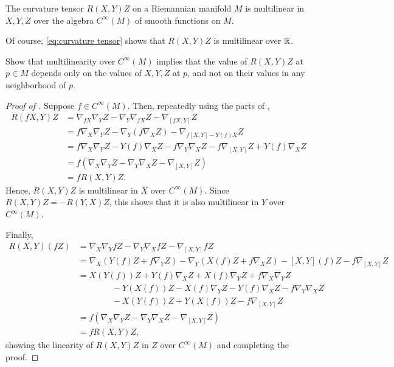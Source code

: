 \begin{proposition}\label{prop:multilinearity of R}
	The curvature tensor $R(X,Y)Z$ on a Riemannian manifold $M$ is multilinear in $X,Y,Z$ over the algebra $C^\infty(M)$ of smooth functions on $M$.
\end{proposition}

Of course, \eqref{eq:curvature tensor} shows that $R(X,Y)Z$ is multilinear over $\mathbb{R}$.

\begin{exercise}\label{ex:R depends only on a point}
	Show that multilinearity over $C^\infty(M)$ implies that the value of $R(X,Y)Z$ at $p \in M$ depends only on the values of $X,Y,Z$ at $p$, and not on their values in any neighborhood of $p$.
\end{exercise}

\begin{proof}[Proof of ]
	Suppose $f \in C^\infty(M)$. Then, repeatedly using the parts of ,
	\begin{align*}
		R(fX,Y)Z & = \nabla_{fX}\nabla_Y Z - \nabla_Y \nabla_{fX}Z - \nabla_{[fX,Y]}Z \\
		& = f\nabla_X\nabla_YZ - \nabla_Y(f\nabla_X Z) - \nabla_{f[X,Y] - Y(f)X}Z \\
		& = f\nabla_X\nabla_YZ - Y(f) \nabla_XZ - f\nabla_Y\nabla_XZ - f\nabla_{[X,Y]}Z + Y(f) \nabla_XZ \\
		& = f(\nabla_X\nabla_YZ- \nabla_Y\nabla_XZ - \nabla_{[X,Y]}Z) \\
		& = f R(X,Y)Z.
	\end{align*}
	Hence, $R(X,Y)Z$ is multilinear in $X$ over $C^\infty(M)$. Since $R(X,Y)Z = -R(Y,X)Z$, this shows that it is also multilinear in $Y$ over $C^\infty(M)$.
	
	Finally,
	\begin{align*}
		R(X,Y)(fZ) & = \nabla_X \nabla_Y fZ - \nabla_Y \nabla_X fZ - \nabla_{[X,Y]}fZ \\
		& = \nabla_X(Y(f)Z + f \nabla_YZ) - \nabla_Y(X(f)Z + f \nabla_XZ) - [X,Y](f)Z - f \nabla_{[X,Y]}Z \\
		& = X(Y(f))Z + Y(f) \nabla_XZ +  X(f) \nabla_Y Z + f \nabla_X \nabla_Y Z \\
		& \qquad \qquad - Y(X(f))Z - X(f) \nabla_YZ - Y(f) \nabla_XZ - f \nabla_Y\nabla_XZ \\
		& \qquad \qquad - X(Y(f))Z + Y(X(f))Z - f \nabla_{[X,Y]}Z \\
		& = f(\nabla_X \nabla_Y Z - \nabla_Y \nabla_X Z - \nabla_{[X,Y]}Z) \\
		& = f R(X,Y)Z,
	\end{align*}
	showing the linearity of $R(X,Y)Z$ in $Z$ over $C^\infty(M)$ and completing the proof.
\end{proof}

